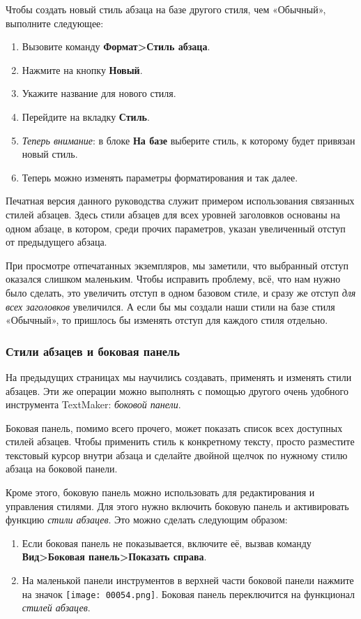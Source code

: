\documentclass[a4paper,10pt]{article}
\begin{document}
Чтобы создать новый стиль абзаца на базе другого стиля, чем «Обычный», выполните следующее:
\begin{enumerate}
 \item Вызовите команду \textbf{Формат>Стиль абзаца}.
 \item Нажмите на кнопку \textbf{Новый}.
 \item Укажите название для нового стиля.
 \item Перейдите на вкладку \textbf{Стиль}.
 \item \textit{Теперь внимание}: в блоке \textbf{На базе} выберите стиль, к которому будет привязан новый стиль.
 \item Теперь можно изменять параметры форматирования и так далее.
\end{enumerate}

Печатная версия данного руководства служит примером использования связанных стилей абзацев. Здесь стили абзацев для всех уровней заголовков основаны на одном абзаце, в котором, среди прочих параметров, указан увеличенный отступ от предыдущего абзаца.

При просмотре отпечатанных экземпляров, мы заметили, что выбранный отступ оказался слишком маленьким. Чтобы исправить проблему, всё, что нам нужно было сделать, это увеличить отступ в одном базовом стиле, и сразу же отступ \textit{для всех заголовков} увеличился. А если бы мы создали наши стили на базе стиля «Обычный», то пришлось бы изменять отступ для каждого стиля отдельно.

\subsubsection{Стили абзацев и боковая панель}
На предыдущих страницах мы научились создавать, применять и изменять стили абзацев. Эти же операции можно выполнять с помощью другого очень удобного инструмента TextMaker: \textit{боковой панели}.

Боковая панель, помимо всего прочего, может показать список всех доступных стилей абзацев. Чтобы применить стиль к конкретному тексту, просто разместите текстовый курсор внутри абзаца и сделайте двойной щелчок по нужному стилю абзаца на боковой панели.

Кроме этого, боковую панель можно использовать для редактирования и управления стилями. Для этого нужно включить боковую панель и активировать функцию \textit{стили абзацев}. Это можно сделать следующим образом:
\begin{enumerate}
 \item Если боковая панель не показывается, включите её, вызвав команду \textbf{Вид>Боковая панель>Показать справа}.
 \item На маленькой панели инструментов в верхней части боковой панели нажмите на значок \texttt{[image: 00054.png]}. Боковая панель переключится на функционал \textit{стилей абзацев}. 
\end{enumerate}
\end{document}
